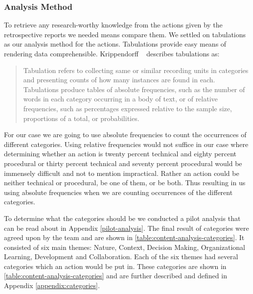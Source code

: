 \subsubsection{Analysis Method}
To retrieve any research-worthy knowledge from the actions given by the retrospective reports we needed means compare them. We settled on tabulations as our analysis method for the actions. Tabulations provide easy means of rendering data comprehensible. Krippendorff ~\cite{Krippendorff2004} describes tabulations as: 

\begin{quote}
Tabulation refers to collecting same or similar recording units in categories and presenting counts of how many instances are found in each. Tabulations produce tables of absolute frequencies, such as the number of words in each category occurring in a body of text, or of relative frequencies, such as percentages expressed relative to the sample size, proportions of a total, or probabilities.
\end{quote}

For our case we are going to use absolute frequencies to count the occurrences of different categories. Using relative frequencies would not suffice in our case where determining whether an action is twenty percent technical and eighty percent procedural or thirty percent technical and seventy percent procedural would be immensely difficult and not to mention impractical. Rather an action could be neither technical or procedural, be one of them, or be both. Thus resulting in us using absolute frequencies when we are counting occurrences of the different categories. 

To determine what the categories should be we conducted a pilot analysis that can be read about in Appendix \autoref{pilot-analysis}. The final result of categories were agreed upon by the team and are shown in \autoref{table:content-analysis-categories}. It consisted of six main themes: Nature, Context, Decision Making, Organizational Learning, Development and Collaboration. Each of the six themes had several categories which an action would be put in. These categories are shown in \autoref{table:content-analysis-categories} and are further described and defined in Appendix \autoref{appendix:categories}. 

